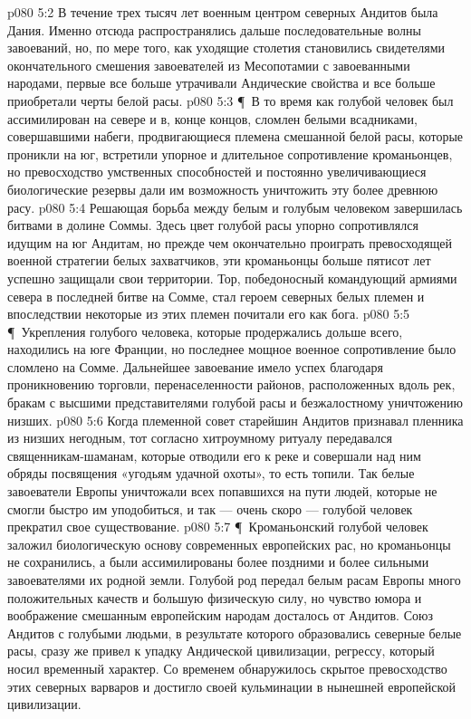\vs p080 5:2 В течение трех тысяч лет военным центром северных Андитов была Дания. Именно отсюда распространялись дальше последовательные волны завоеваний, но, по мере того, как уходящие столетия становились свидетелями окончательного смешения завоевателей из Месопотамии с завоеванными народами, первые все больше утрачивали Андические свойства и все больше приобретали черты белой расы.
\vs p080 5:3 \P\ В то время как голубой человек был ассимилирован на севере и в, конце концов, сломлен белыми всадниками, совершавшими набеги, продвигающиеся племена смешанной белой расы, которые проникли на юг, встретили упорное и длительное сопротивление кроманьонцев, но превосходство умственных способностей и постоянно увеличивающиеся биологические резервы дали им возможность уничтожить эту более древнюю расу.
\vs p080 5:4 Решающая борьба между белым и голубым человеком завершилась битвами в долине Соммы. Здесь цвет голубой расы упорно сопротивлялся идущим на юг Андитам, но прежде чем окончательно проиграть превосходящей военной стратегии белых захватчиков, эти кроманьонцы больше пятисот лет успешно защищали свои территории. Тор, победоносный командующий армиями севера в последней битве на Сомме, стал героем северных белых племен и впоследствии некоторые из этих племен почитали его как бога.
\vs p080 5:5 \P\ Укрепления голубого человека, которые продержались дольше всего, находились на юге Франции, но последнее мощное военное сопротивление было сломлено на Сомме. Дальнейшее завоевание имело успех благодаря проникновению торговли, перенаселенности районов, расположенных вдоль рек, бракам с высшими представителями голубой расы и безжалостному уничтожению низших.
\vs p080 5:6 Когда племенной совет старейшин Андитов признавал пленника из низших негодным, тот согласно хитроумному ритуалу передавался священникам\hyp{}шаманам, которые отводили его к реке и совершали над ним обряды посвящения «угодьям удачной охоты», то есть топили. Так белые завоеватели Европы уничтожали всех попавшихся на пути людей, которые не смогли быстро им уподобиться, и так --- очень скоро --- голубой человек прекратил свое существование.
\vs p080 5:7 \P\ Кроманьонский голубой человек заложил биологическую основу современных европейских рас, но кроманьонцы не сохранились, а были ассимилированы более поздними и более сильными завоевателями их родной земли. Голубой род передал белым расам Европы много положительных качеств и большую физическую силу, но чувство юмора и воображение смешанным европейским народам досталось от Андитов. Союз Андитов с голубыми людьми, в результате которого образовались северные белые расы, сразу же привел к упадку Андической цивилизации, регрессу, который носил временный характер. Со временем обнаружилось скрытое превосходство этих северных варваров и достигло своей кульминации в нынешней европейской цивилизации.

